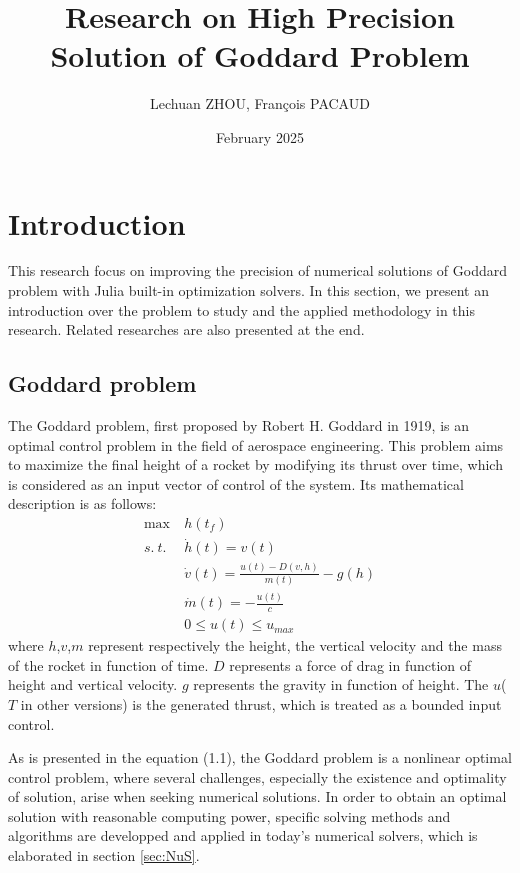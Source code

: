 \documentclass{article}
\title{Research on High Precision Solution of Goddard Problem}
\author{Lechuan ZHOU, François PACAUD}
\date{February 2025}
\begin{document}
\maketitle

\newpage
\tableofcontents
\clearpage


\section{Introduction}
This research focus on improving the precision of numerical solutions of Goddard problem with Julia built-in optimization solvers. In this section, we present an introduction over the problem to study and the applied methodology in this research. Related researches are also presented at the end. 
\subsection{Goddard problem}
\label{sec:GoP}
The Goddard problem, first proposed by Robert H. Goddard in 1919\cite{A method of reaching}, is an optimal control problem in the field of aerospace engineering. This problem aims to maximize the final height of a rocket by modifying its thrust over time, which is considered as an input vector of control of the system. Its mathematical description is as follows:
\begin{align*}
\max \ &h(t_{f}) \\
s. \ t. \ & \dot{h}(t) = v(t) \\
& \dot{v}(t) = \frac{u(t)-D(v,h)}{m(t)}-g(h) \tag{1.1}\\
& \dot{m}(t) = -\frac{u(t)}{c} \\
& 0 \le u(t) \le u_{max}
\end{align*} 
where $h$,$v$,$m$ represent respectively the height, the vertical velocity and the mass of the rocket in function of time. $D$ represents a force of drag in function of height and vertical velocity. $g$ represents the gravity in function of height. The $u$($T$ in other versions) is the generated thrust, which is treated as a bounded input control.

As is presented in the equation (1.1), the Goddard problem is a nonlinear optimal control problem, where several challenges, especially the existence and optimality of solution, arise when seeking numerical solutions. In order to obtain an optimal solution with reasonable computing power, specific solving methods and algorithms are developped and applied in today's numerical solvers, which is elaborated in section \ref{sec:NuS}.
\end{document}
